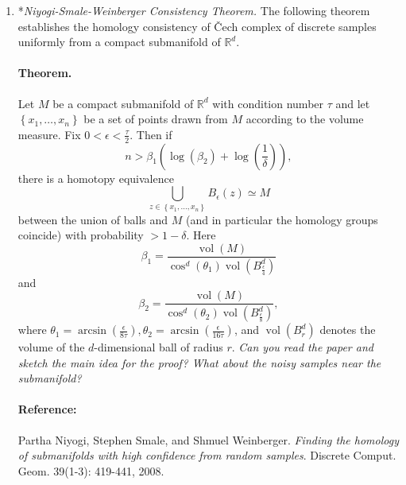 \documentclass[11pt]{article}
\def\R{{\mathbb R}}
\begin{document}
\begin{enumerate}
\item *{\em Niyogi-Smale-Weinberger Consistency Theorem.} The following theorem establishes the homology consistency of \v{C}ech complex of discrete samples uniformly from a compact submanifold of $\R^d$. 
\paragraph{Theorem.}{} Let $M$ be a compact submanifold of $\mathbb{R}^{d}$ with condition number $\tau$ and let $\left\{x_{1}, \ldots, x_{n}\right\}$ be a set of points drawn from $M$ according to the volume measure. Fix $0<\epsilon<\frac{\tau}{2}$. Then if
$$
n>\beta_{1}\left(\log \left(\beta_{2}\right)+\log \left(\frac{1}{\delta}\right)\right),
$$
there is a homotopy equivalence
$$
\bigcup_{z \in\left\{x_{1}, \ldots, x_{n}\right\}} B_{\epsilon}(z) \simeq M
$$
between the union of balls and $M$ (and in particular the homology groups coincide) with probability $>1-\delta$.
Here
$$
\beta_{1}=\frac{\operatorname{vol}(M)}{\cos ^{d}\left(\theta_{1}\right) \operatorname{vol}\left(B_{\frac{\epsilon}{4}}^{d}\right)}
$$
and
$$
\beta_{2}=\frac{\operatorname{vol}(M)}{\cos ^{d}\left(\theta_{2}\right) \operatorname{vol}\left(B^d_{\frac{\epsilon}{8}} \right)},
$$
where $\theta_{1}=\arcsin \left(\frac{\epsilon}{8 \tau}\right), \theta_{2}=\arcsin \left(\frac{\epsilon}{16 \tau}\right)$, and $\operatorname{vol}\left(B_{r}^{d}\right)$ denotes the volume of the
$d$-dimensional ball of radius $r$.
\emph{Can you read the paper and sketch the main idea for the proof? What about the noisy samples near the submanifold? }
\paragraph{Reference:} Partha Niyogi, Stephen Smale, and Shmuel Weinberger. \emph{Finding the homology of submanifolds with high confidence from random samples}. Discrete Comput. Geom. 39(1-3): 419-441, 2008.
\end{enumerate}
\end{document}
